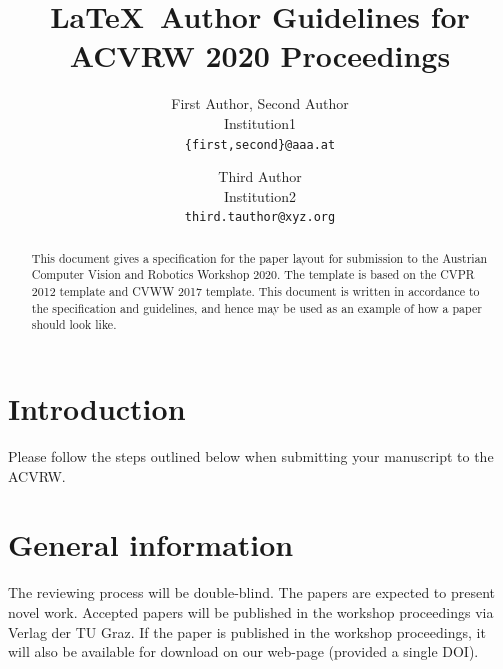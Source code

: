 \documentclass[11pt,twoside,twocolumn,a4paper]{article}
\begin{document}
\title{\LaTeX\ Author Guidelines for ACVRW 2020 Proceedings}


\author{First Author, Second Author\\
Institution1\\
{\tt\small \{first,second\}@aaa.at}
\and
Third Author\\
Institution2\\
{\tt\small third.tauthor@xyz.org}
}


\maketitle
\ifacvrwfinal\thispagestyle{fancy}\fi


\begin{abstract}
This document gives a specification for the paper layout for submission to the 
Austrian Computer Vision and Robotics Workshop 2020. The template is based on 
the CVPR 2012 template and CVWW 2017 template. This document is written in 
accordance to the specification and guidelines, and hence may be used as an 
example of how a paper should look like.
\end{abstract}



\section{Introduction}

Please follow the steps outlined below when submitting your manuscript to the 
ACVRW. 


\section{General information}

The reviewing process will be double-blind. The papers are expected to present 
novel work. Accepted papers will be published in the workshop proceedings via 
Verlag der TU Graz. If the paper is published in the workshop proceedings, it 
will also be available for download on our web-page (provided a single DOI). 
\end{document}
